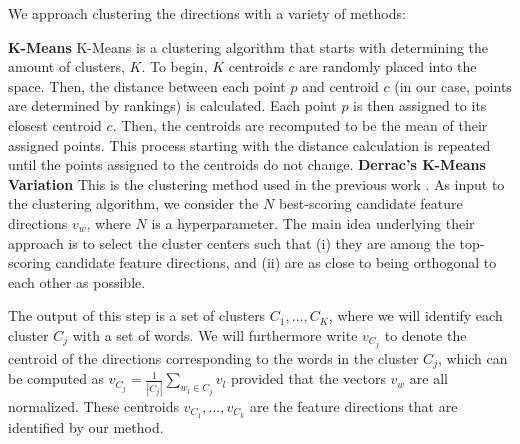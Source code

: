 We approach clustering the directions with a variety of methods:

\noindent \textbf{K-Means} K-Means is a clustering algorithm that starts with determining the amount of clusters, $K$. To begin, $K$ centroids $c$ are randomly placed into the space. Then, the distance between each point $p$ and centroid $c$ (in our case, points are determined by rankings) is calculated. Each point $p$ is then assigned to its closest centroid $c$. Then, the centroids are recomputed to be the mean of their assigned points. This process starting with the distance calculation is repeated until the points assigned to the centroids do not change. 
\noindent \textbf{Derrac's K-Means Variation} This is the clustering method used in the previous work \cite{derracAIJ}. As input to the clustering algorithm, we consider the $N$ best-scoring candidate feature directions $v_w$, where $N$ is a hyperparameter. The main idea underlying their approach is to select the cluster centers such that (i) they are among the top-scoring candidate feature directions, and (ii) are as close to being orthogonal to each other as possible. 
 
The output of this step is a set of clusters $C_1,...,C_K$, where we will identify each cluster $C_j$ with a set of words.
We will furthermore write $v_{C_j}$ to denote the centroid of the directions corresponding to the words in the cluster $C_j$, which can be computed as $v_{C_j}= \frac{1}{|C_j|} \sum_{w_l\in C_j} v_l$ provided that the vectors $v_w$ are all normalized. These centroids $v_{C_1},...,v_{C_k}$ are the feature directions that are identified by our method. 





